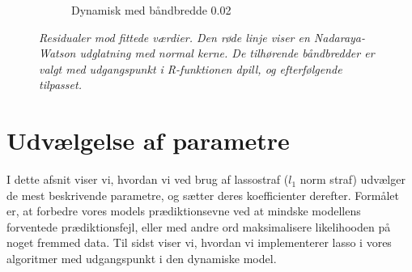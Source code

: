 \documentclass[11pt,a4paper]{article}
\begin{document}
\begin{figure}[h!]
\begin{subfigure}[b]{0.425\linewidth}
    \caption{Dynamisk med båndbredde 0.02}
    \label{fig:ResDU}
  \end{subfigure}
  \caption{\textit{Residualer mod fittede værdier. Den røde linje viser en Nadaraya-Watson udglatning med normal kerne. De tilhørende båndbredder er valgt med udgangspunkt i R-funktionen dpill, og efterfølgende tilpasset.}}
  \label{fig:residualplot}
\end{figure}
\clearpage
\section{Udvælgelse af parametre}
I dette afsnit viser vi, hvordan vi ved brug af lassostraf ($l_1$ norm straf) udvælger de mest beskrivende parametre, og sætter deres koefficienter derefter. Formålet er, at forbedre vores models prædiktionsevne ved at mindske modellens forventede prædiktionsfejl, eller med andre ord maksimalisere likelihooden på noget fremmed data. Til sidst viser vi, hvordan vi implementerer lasso i vores algoritmer med udgangspunkt i den dynamiske model.\\\\
\end{document}
